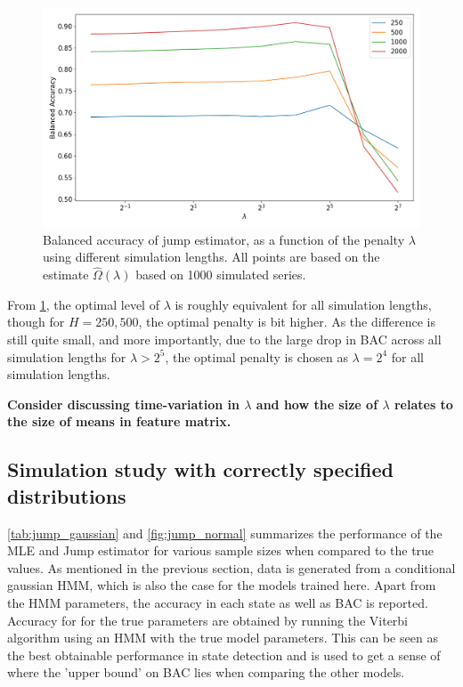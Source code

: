 \begin{figure}[H]
    \centering
    \includegraphics[width=1\textwidth]{analysis/model_convergence/images/jump_penalties.png}
    \caption{Balanced accuracy of jump estimator, as a function of the penalty $\lambda$ using different simulation lengths. All points are based on the estimate $\hat\Omega(\lambda)$ based on 1000 simulated series.}
    \label{fig:jump_penalties}
\end{figure}

From \cref{fig:jump_penalties}, the optimal level of $\lambda$ is roughly equivalent for all simulation lengths, though for $H=250,500$, the optimal penalty is bit higher. As the difference is still quite small, and more importantly, due to the large drop in BAC across all simulation lengths for $\lambda > 2^5$, the optimal penalty is chosen as $\lambda=2^4$ for all simulation lengths. 

\textbf{Consider discussing time-variation in $\lambda$ and how the size of $\lambda$ relates to the size of means in feature matrix.}

\subsection{Simulation study with correctly specified distributions}

\cref{tab:jump_gaussian} and \cref{fig:jump_normal} summarizes the performance of the MLE and Jump estimator for various sample sizes when compared to the true values. As mentioned in the previous section, data is generated from a conditional gaussian HMM, which is also the case for the models trained here. Apart from the HMM parameters, the accuracy in each state as well as BAC is reported. Accuracy for for the true parameters are obtained by running the Viterbi algorithm using an HMM with the true model parameters. This can be seen as the best obtainable performance in state detection and is used to get a sense of where the 'upper bound' on BAC lies when comparing the other models.


